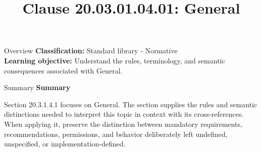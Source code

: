 \documentclass[10pt,letterpaper]{article}
\title{Clause 20.03.01.04.01: General}
\author{}
\date{}
\begin{document}
\maketitle
\begin{CornellOverviewBox}{Overview}
\textbf{Classification:} Standard library - Normative\\[2pt]
\textbf{Learning objective:} Understand the rules, terminology, and semantic consequences associated with General.
\end{CornellOverviewBox}\begin{CornellSummaryBox}{Summary}
{\sffamily\bfseries\color{Accent} Summary}\par\vspace{3pt}Section 20.3.1.4.1 focuses on General. The section supplies the rules and semantic distinctions needed to interpret this topic in context with its cross-references. When applying it, preserve the distinction between mandatory requirements, recommendations, permissions, and behavior deliberately left undefined, unspecified, or implementation-defined.
\end{CornellSummaryBox}
\end{document}
